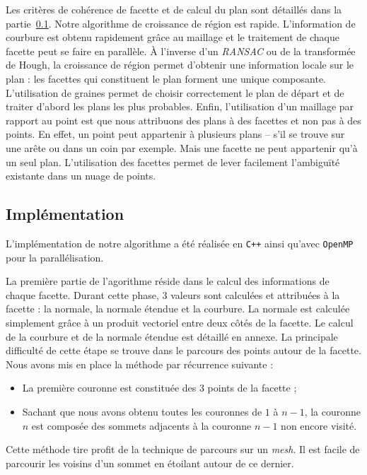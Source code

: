 ﻿\documentclass[12pt, twoside]{article}
\begin{document}
Les critères de cohérence de facette et de calcul du plan sont détaillés dans la partie~\ref{subsec:growthimpl}. Notre algorithme de croissance de région est rapide. L'information de courbure est obtenu rapidement grâce au maillage et le traitement de chaque facette peut se faire en parallèle. À l'inverse d'un \textit{RANSAC} ou de la transformée de Hough, la croissance de région permet d'obtenir une information locale sur le plan : les facettes qui constituent le plan forment une unique composante. L'utilisation de graines permet de choisir correctement le plan de départ et de traiter d'abord les plans les plus probables. Enfin, l'utilisation d'un maillage par rapport au point est que nous attribuons des plans à des facettes et non pas à des points. En effet, un point peut appartenir à plusieurs plans -- s'il se trouve sur une arête ou dans un coin par exemple. Mais une facette ne peut appartenir qu'à un seul plan. L'utilisation des facettes permet de lever facilement l'ambiguïté existante dans un nuage de points.

\subsection{Implémentation}
\label{subsec:growthimpl}
L'implémentation de notre algorithme a été réalisée en \texttt{C++} ainsi qu'avec \texttt{OpenMP} pour la parallélisation.

La première partie de l'agorithme réside dans le calcul des informations de chaque facette. Durant cette phase, 3 valeurs sont calculées et attribuées à la facette : la normale, la normale étendue et la courbure. La normale est calculée simplement grâce à un produit vectoriel entre deux côtés de la facette. Le calcul de la courbure et de la normale étendue est détaillé en annexe. La principale difficulté de cette étape se trouve dans le parcours des points autour de la facette. Nous avons mis en place la méthode par récurrence suivante :
\begin{itemize}
  \item La première couronne est constituée des 3 points de la facette ;
  \item Sachant que nous avons obtenu toutes les couronnes de $1$ à $n-1$, la couronne $n$ est composée des sommets adjacents à la couronne $n-1$ non encore visité.
\end{itemize}
Cette méthode tire profit de la technique de parcours sur un \textit{mesh}. Il est facile de parcourir les voisins d'un sommet en étoilant autour de ce dernier.
\end{document}
